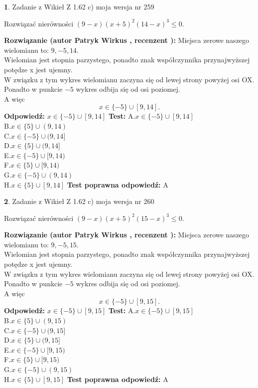 \documentclass[12pt, a4paper]{article}
\theoremstyle{definition} %
\newtheorem{zad}{}
\newcommand{\zadStart}[1]{\begin{zad}#1\newline}
\newcommand{\zadStop}{\end{zad}}
\newcommand{\rozwStart}[2]{\noindent \textbf{Rozwiązanie (autor #1 , recenzent #2): }\newline}
\newcommand{\rozwStop}{\newline}
\newcommand{\odpStart}{\noindent \textbf{Odpowiedź:}\newline}
\newcommand{\odpStop}{\newline}
\newcommand{\testStart}{\noindent \textbf{Test:}\newline}
\newcommand{\testStop}{\newline}
\newcommand{\kluczStart}{\noindent \textbf{Test poprawna odpowiedź:}\newline}
\newcommand{\kluczStop}{\newline}
\begin{document}
\zadStart{Zadanie z Wikieł Z 1.62 c) moja wersja nr 259}

Rozwiązać nierówności $(9-x)(x+5)^{2}(14-x)^{3}\le0$.
\zadStop
\rozwStart{Patryk Wirkus}{}
Miejsca zerowe naszego wielomianu to: $9, -5, 14$.\\
Wielomian jest stopnia parzystego, ponadto znak współczynnika przy\linebreak najwyższej potędze x jest ujemny.\\ W związku z tym wykres wielomianu zaczyna się od lewej strony powyżej osi OX.\\
Ponadto w punkcie $-5$ wykres odbija się od osi poziomej.\\
A więc $$x \in \{-5\} \cup [9,14].$$
\rozwStop
\odpStart
$x \in \{-5\} \cup [9,14]$
\odpStop
\testStart
A.$x \in \{-5\} \cup [9,14]$\\
B.$x \in \{5\} \cup (9,14)$\\
C.$x \in \{-5\} \cup (9,14]$\\
D.$x \in \{5\} \cup (9,14]$\\
E.$x \in \{-5\} \cup [9,14)$\\
F.$x \in \{5\} \cup [9,14)$\\
G.$x \in \{-5\} \cup (9,14)$\\
H.$x \in \{5\} \cup [9,14]$
\testStop
\kluczStart
A
\kluczStop



\zadStart{Zadanie z Wikieł Z 1.62 c) moja wersja nr 260}

Rozwiązać nierówności $(9-x)(x+5)^{2}(15-x)^{3}\le0$.
\zadStop
\rozwStart{Patryk Wirkus}{}
Miejsca zerowe naszego wielomianu to: $9, -5, 15$.\\
Wielomian jest stopnia parzystego, ponadto znak współczynnika przy\linebreak najwyższej potędze x jest ujemny.\\ W związku z tym wykres wielomianu zaczyna się od lewej strony powyżej osi OX.\\
Ponadto w punkcie $-5$ wykres odbija się od osi poziomej.\\
A więc $$x \in \{-5\} \cup [9,15].$$
\rozwStop
\odpStart
$x \in \{-5\} \cup [9,15]$
\odpStop
\testStart
A.$x \in \{-5\} \cup [9,15]$\\
B.$x \in \{5\} \cup (9,15)$\\
C.$x \in \{-5\} \cup (9,15]$\\
D.$x \in \{5\} \cup (9,15]$\\
E.$x \in \{-5\} \cup [9,15)$\\
F.$x \in \{5\} \cup [9,15)$\\
G.$x \in \{-5\} \cup (9,15)$\\
H.$x \in \{5\} \cup [9,15]$
\testStop
\kluczStart
A
\kluczStop
\end{document}
